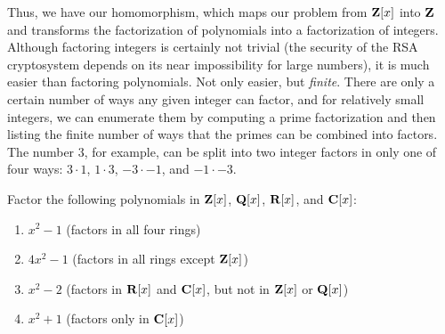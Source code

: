 Thus, we have our homomorphism, which maps our problem from ${\bf
Z}[x]$ into ${\bf Z}$ and transforms the factorization of polynomials
into a factorization of integers.  Although factoring integers is
certainly not trivial (the security of the RSA cryptosystem depends on
its near impossibility for large numbers), it is much easier than
factoring polynomials.  Not only easier, but {\it finite}.  There are
only a certain number of ways any given integer can factor, and for
relatively small integers, we can enumerate them by computing a prime
factorization and then listing the finite number of ways that the
primes can be combined into factors.  The number $3$, for example, can
be split into two integer factors in only one of four ways: $3\cdot1$,
$1\cdot3$, $-3\cdot-1$, and $-1\cdot-3$.

\begin{comment}

\mysection{Axiom Soup}

At this point, the reader might begin to suspect that we build up a
theory from our axioms, and whenever we get stuck, we introduce a new
axiom so that we can move forward!  In a sense, this is true, but
don't miss an important point.  While the axioms are axioms in the
sense that you can't prove U1 or I1 for an arbitrary ring (i.e, just
given the R axioms), they are also theorems in the sense that we can
prove them for the particular systems of interest to us.  We prove the
axioms both for our base system ${\bf Z}$ (the integers form a unique
factorization domain), and for any constructed system ${\cal F}[x]$ (a
polynomial ring in a single {\it transcendental} variable over a field
is also a unique factorization domain).

Let me close this chapter by proving this in a series of theorems.

\end{comment}

\vfill\eject
{}

Factor the following polynomials in ${\bf Z}[x]$, ${\bf Q}[x]$, ${\bf R}[x]$, and ${\bf C}[x]$:

\begin{enumerate}
\item $x^2-1$  (factors in all four rings)
\item $4x^2-1$ (factors in all rings except ${\bf Z}[x]$)
\item $x^2-2$  (factors in ${\bf R}[x]$ and ${\bf C}[x]$, but not in ${\bf Z}[x]$ or ${\bf Q}[x]$)
\item $x^2+1$  (factors only in ${\bf C}[x]$)
\end{enumerate}

